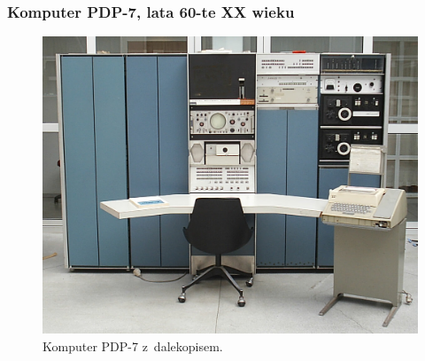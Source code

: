 \documentclass[10pt,t]{beamer}
\begin{document}
\begin{frame}
  \frametitle{Komputer PDP-7, lata 60-te XX wieku}


  \begin{figure}

    \centering


    \includegraphics[scale=0.2]
    {./PresentationsPictures/Machines-Pictures/PDP-7-with-teletype.jpeg}

    \caption{Komputer PDP-7 z~dalekopisem.}

    \label{fig:PDP-7-z-dalekopisem}

  \end{figure}

\end{frame}
\end{document}

